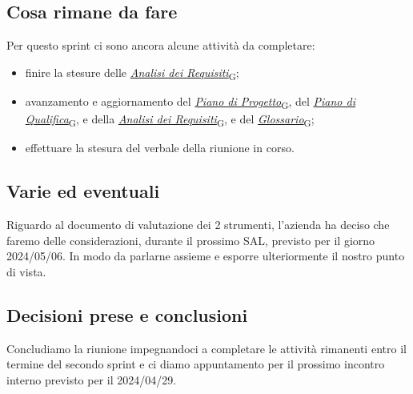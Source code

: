\documentclass[italian,12pt]{article}
\begin{document}
\subsection{Cosa rimane da fare}
Per questo sprint ci sono ancora alcune attività da completare:
\begin{itemize}
	\item finire la stesure delle \href{https://7last.github.io/docs/rtb/documentazione-interna/glossario#analisi-dei-requisiti}{\textit{Analisi dei Requisiti}\textsubscript{G}};
	\item avanzamento e aggiornamento del \href{https://7last.github.io/docs/rtb/documentazione-interna/glossario#piano-di-progetto}{\textit{Piano di Progetto}\textsubscript{G}}, del \href{https://7last.github.io/docs/rtb/documentazione-interna/glossario#piano-di-qualifica}{\textit{Piano di Qualifica}\textsubscript{G}}, e della \href{https://7last.github.io/docs/rtb/documentazione-interna/glossario#analisi-dei-requisiti}{\textit{Analisi dei Requisiti}\textsubscript{G}}, e del \href{https://7last.github.io/docs/rtb/documentazione-interna/glossario#glossario}{\textit{Glossario}\textsubscript{G}};
	\item effettuare la stesura del verbale della riunione in corso.
\end{itemize}

\subsection{Varie ed eventuali}
Riguardo al documento di valutazione dei 2 strumenti, l'azienda ha deciso che faremo delle considerazioni, durante il prossimo SAL, previsto per il giorno 2024/05/06. In modo da parlarne assieme e esporre ulteriormente il nostro punto di vista.

\subsection{Decisioni prese e conclusioni}
Concludiamo la riunione impegnandoci a completare le attività rimanenti entro il termine del secondo sprint e ci diamo appuntamento per il prossimo incontro interno previsto per il 2024/04/29.
\end{document}
